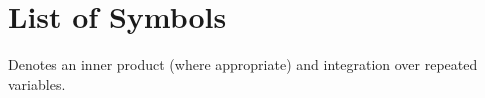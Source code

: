\label{sec:list_of_syms}

\chapter*{List of Symbols}

\begin{description}[labelsep=1cm]
    \item[$\ast$] { Denotes an inner product (where appropriate) and
        integration over repeated variables.
    }
\end{description}
